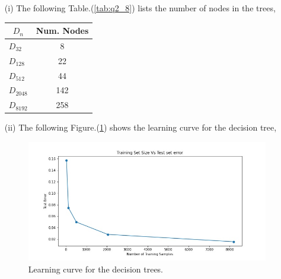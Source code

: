 \documentclass[a4paper]{article}
\theoremstyle{definition}
\newenvironment{soln}{
    \leavevmode\color{blue}\ignorespaces
}{}
\begin{document}
\begin{soln}
  \begin{itemize}
    \item [(i)] The following Table.(\ref{tab:q2_8}) lists the number of nodes in the trees,
    \begin{table}[H]
      \centering
      \begin{tabular}{|l|c|}
      \hline
      \multicolumn{1}{|c|}{$D_n$} & \textbf{Num. Nodes} \\ \hline
      $D_{32}$                               & 8                  \\ \hline
      $D_{128}$                               & 22                   \\ \hline
      $D_{512}$                               & 44                   \\ \hline
      $D_{2048}$                               & 142                  \\ \hline
      $D_{8192}$                               & 258                 \\ \hline
      \end{tabular}
      \end{table}
      \label{tab:q2_8}

      \item [(ii)] The following Figure.(\ref{fig:q2_9}) shows the learning curve for the decision tree,
        \begin{figure}[H]
          \centering
          \includegraphics[width=12cm]{q27_nodes_v_err.jpg}
          \caption{Learning curve for the decision trees.}
          \label{fig:q2_9}
        \end{figure}


\end{itemize}
\end{soln}
\end{document}
